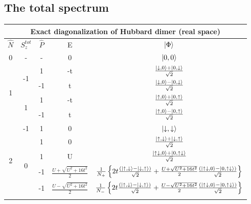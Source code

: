 \documentclass[12pt]{article}
\begin{document}
\subsection{The total spectrum}
\begin{center}
\begin{tabular}{@{}ccccc@{}}
\toprule
	\multicolumn{5}{c}{\bf{Exact diagonalization of Hubbard dimer (real space)}} \\
\toprule
\(\hat{N}\) & \(S_z^{tot}\) & \(\hat{P}\) & E & \(\ket{\Phi}\)\\
\toprule
0 & - & - & 0 & \(\ket{0,0}\) \\ \toprule
\multicolumn{1}{c}{\multirow{4}{*}{1}} & \multirow{2}{*}{-1} & 1  & -t  & \(\frac{\ket{\downarrow,0}+\ket{0,\downarrow}}{\sqrt{2}}\)  \\ \cmidrule(l){3-5} 
\multicolumn{1}{c}{}                   &                     & -1 & t   & \(\frac{\ket{\downarrow,0}-\ket{0,\downarrow}}{\sqrt{2}}\)  \\ \cmidrule(l){2-5}
\multicolumn{1}{c}{}                   & \multirow{2}{*}{1}  & 1  & -t  & \(\frac{\ket{\uparrow,0}+\ket{0,\uparrow}}{\sqrt{2}}\)  \\ \cmidrule(l){3-5} 
\multicolumn{1}{c}{}                   &                     & -1 & t   & \(\frac{\ket{\uparrow,0}-\ket{0,\uparrow}}{\sqrt{2}}\)  \\ \toprule
\multirow{6}{*}{2}                     & -1                  & 1  & 0   & \(\ket{\downarrow,\downarrow}\)  \\ \cmidrule(l){2-5} 
                                       & \multirow{4}{*}{0}  & 1  & 0   & \(\frac{\ket{\uparrow,\downarrow}+\ket{\downarrow,\uparrow}}{\sqrt{2}}\)  \\ \cmidrule(l){3-5} 
                                       &                     & 1  & U   & \(\frac{\ket{\uparrow\downarrow,0}+\ket{0,\uparrow\downarrow}}{\sqrt{2}}\)  \\ \cmidrule(l){3-5} 
                                       &                     & -1 & \(\frac{U+\sqrt{U^2+16 t^2}}{2}\)    & \(\frac{1}{N_+}\left\{{2t \frac{(\ket{\uparrow,\downarrow}-\ket{\downarrow,\uparrow})}{\sqrt{2}} + \frac{U+\sqrt{U^2+16 t^2}}{2} \frac{(\ket{\uparrow\downarrow,0}-\ket{0,\uparrow\downarrow})}{\sqrt{2}}}\right\}\)  \\ \cmidrule(l){3-5} 
                                       &                     & -1 & \(\frac{U-\sqrt{U^2+16 t^2}}{2}\)    & \(\frac{1}{N_-}\left\{{2t \frac{(\ket{\uparrow,\downarrow}-\ket{\downarrow,\uparrow})}{\sqrt{2}} + \frac{U-\sqrt{U^2+16 t^2}}{2} \frac{(\ket{\uparrow\downarrow,0}-\ket{0,\uparrow\downarrow})}{\sqrt{2}}}\right\}\)  \\ \cmidrule(l){2-5} 

\end{tabular}
\end{center}
\end{document}
